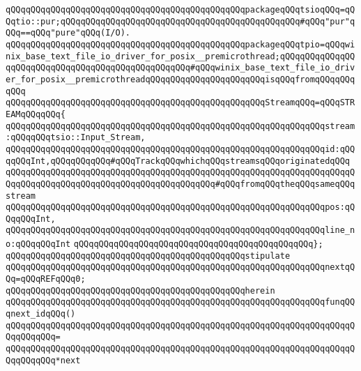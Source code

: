 \verb|qQQqqQQqqQQqqQQqqQQqqQQqqQQqqQQqqQQqqQQqqQQqqQQqpackageqQQqtsioqQQq=qQQqtio::pur;qQQqqQQqqQQqqQQqqQQqqQQqqQQqqQQqqQQqqQQqqQQqqQQq#qQQq"pur"qQQq==qQQq"pure"qQQq(I/O).|\newline
\newline
\verb|qQQqqQQqqQQqqQQqqQQqqQQqqQQqqQQqqQQqqQQqqQQqqQQqpackageqQQqtpio=qQQqwinix_base_text_file_io_driver_for_posix__premicrothread;qQQqqQQqqQQqqQQqqQQqqQQqqQQqqQQqqQQqqQQqqQQqqQQqqQQq#qQQqwinix_base_text_file_io_driver_for_posix__premicrothreadqQQqqQQqqQQqqQQqqQQqqQQqisqQQqfromqQQqqQQqqQQq|\newline
\newline
\verb|qQQqqQQqqQQqqQQqqQQqqQQqqQQqqQQqqQQqqQQqqQQqqQQqqQQqStreamqQQq=qQQqSTREAMqQQqqQQq{|\newline
\verb|qQQqqQQqqQQqqQQqqQQqqQQqqQQqqQQqqQQqqQQqqQQqqQQqqQQqqQQqqQQqqQQqstream:qQQqqQQqtsio::Input_Stream,|\newline
\verb|qQQqqQQqqQQqqQQqqQQqqQQqqQQqqQQqqQQqqQQqqQQqqQQqqQQqqQQqqQQqqQQqid:qQQqqQQqInt,qQQqqQQqqQQq#qQQqTrackqQQqwhichqQQqstreamsqQQqoriginatedqQQq|\newline
\verb|qQQqqQQqqQQqqQQqqQQqqQQqqQQqqQQqqQQqqQQqqQQqqQQqqQQqqQQqqQQqqQQqqQQqqQQqqQQqqQQqqQQqqQQqqQQqqQQqqQQqqQQqqQQqqQQq#qQQqfromqQQqtheqQQqsameqQQqstream|\newline
\verb|qQQqqQQqqQQqqQQqqQQqqQQqqQQqqQQqqQQqqQQqqQQqqQQqqQQqqQQqqQQqqQQqpos:qQQqqQQqInt,|\newline
\verb|qQQqqQQqqQQqqQQqqQQqqQQqqQQqqQQqqQQqqQQqqQQqqQQqqQQqqQQqqQQqqQQqline_no:qQQqqQQqInt|\newline
\verb|qQQqqQQqqQQqqQQqqQQqqQQqqQQqqQQqqQQqqQQqqQQqqQQq};|\newline
\newline
\verb|qQQqqQQqqQQqqQQqqQQqqQQqqQQqqQQqqQQqqQQqqQQqqQQqstipulate|\newline
\verb|qQQqqQQqqQQqqQQqqQQqqQQqqQQqqQQqqQQqqQQqqQQqqQQqqQQqqQQqqQQqqQQqnextqQQq=qQQqREFqQQq0;|\newline
\verb|qQQqqQQqqQQqqQQqqQQqqQQqqQQqqQQqqQQqqQQqqQQqqQQqherein|\newline
\verb|qQQqqQQqqQQqqQQqqQQqqQQqqQQqqQQqqQQqqQQqqQQqqQQqqQQqqQQqqQQqqQQqfunqQQqnext_idqQQq()|\newline
\verb|qQQqqQQqqQQqqQQqqQQqqQQqqQQqqQQqqQQqqQQqqQQqqQQqqQQqqQQqqQQqqQQqqQQqqQQqqQQqqQQq=|\newline
\verb|qQQqqQQqqQQqqQQqqQQqqQQqqQQqqQQqqQQqqQQqqQQqqQQqqQQqqQQqqQQqqQQqqQQqqQQqqQQqqQQq*next|\newline
